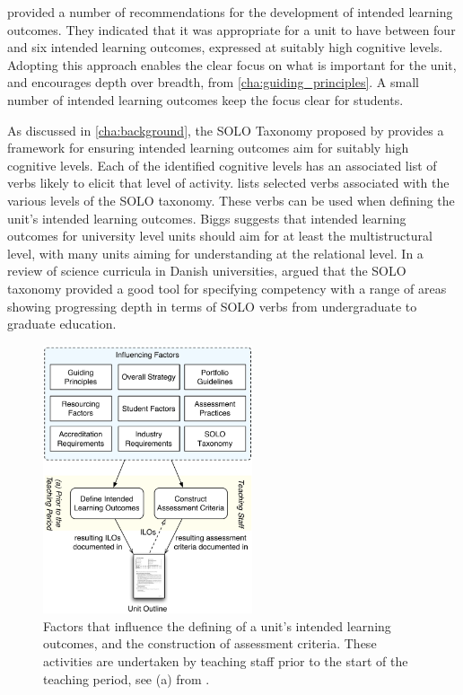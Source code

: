 \citet{Biggs:2007} provided a number of recommendations for the development of intended learning outcomes. They indicated that it was appropriate for a unit to have between four and six intended learning outcomes, expressed at suitably high cognitive levels. Adopting this approach enables the clear focus on what is important for the unit, and encourages depth over breadth,  from \cref{cha:guiding_principles}. A small number of intended learning outcomes keep the focus clear for students.


As discussed in \cref{cha:background}, the SOLO Taxonomy proposed by \citet{Biggs:1982} provides a framework for ensuring intended learning outcomes aim for suitably high cognitive levels. Each of the identified cognitive levels has an associated list of verbs likely to elicit that level of activity.  lists selected verbs associated with the various levels of the SOLO taxonomy. These verbs can be used when defining the unit's intended learning outcomes. Biggs suggests that intended learning outcomes for university level units should aim for at least the multistructural level, with many units aiming for understanding at the relational level. In a review of science curricula in Danish universities, \citet{Brabrand:2009} argued that the SOLO taxonomy provided a good tool for specifying competency with a range of areas showing progressing depth in terms of SOLO verbs from undergraduate to graduate education.

\begin{figure}[p]
	\centering
	\includegraphics[width=0.55\textwidth]{DefiningILOs}
	\caption{Factors that influence the defining of a unit's intended learning outcomes, and the construction of assessment criteria. These activities are undertaken by teaching staff prior to the start of the teaching period, see (a) from . }
	\label{fig:defining_ilos}
\end{figure}

